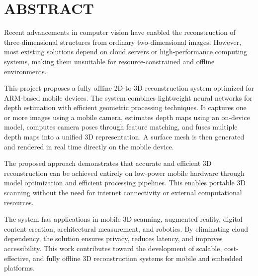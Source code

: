 \section*{\centering ABSTRACT}

Recent advancements in computer vision have enabled the reconstruction of three-dimensional structures from ordinary two-dimensional images. However, most existing solutions depend on cloud servers or high-performance computing systems, making them unsuitable for resource-constrained and offline environments. 

This project proposes a fully offline 2D-to-3D reconstruction system optimized for ARM-based mobile devices. The system combines lightweight neural networks for depth estimation with efficient geometric processing techniques. It captures one or more images using a mobile camera, estimates depth maps using an on-device model, computes camera poses through feature matching, and fuses multiple depth maps into a unified 3D representation. A surface mesh is then generated and rendered in real time directly on the mobile device.

The proposed approach demonstrates that accurate and efficient 3D reconstruction can be achieved entirely on low-power mobile hardware through model optimization and efficient processing pipelines. This enables portable 3D scanning without the need for internet connectivity or external computational resources.

The system has applications in mobile 3D scanning, augmented reality, digital content creation, architectural measurement, and robotics. By eliminating cloud dependency, the solution ensures privacy, reduces latency, and improves accessibility. This work contributes toward the development of scalable, cost-effective, and fully offline 3D reconstruction systems for mobile and embedded platforms.

\thispagestyle{empty}
\newpage